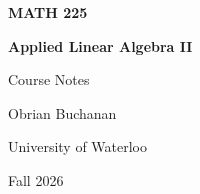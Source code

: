 \documentclass[11pt,letterpaper]{article}
\begin{document}
\hypersetup{pageanchor=false}
\begin{titlepage}
    \vspace*{\fill}
    \begin{center}
        {\Huge\bfseries\color{ink} MATH 225\par}
        \vspace{0.4cm}
        {\LARGE\bfseries\color{ink} Applied Linear Algebra II\par}
        \vspace{1.2cm}
        {\Large Course Notes\par}
        \vspace{0.6cm}
        {\large Obrian Buchanan\par}
        \vspace{0.3cm}
        {\large University of Waterloo\par}
        \vspace{0.3cm}
        {\large Fall 2026\par}
    \end{center}
    \vspace*{\fill}
\end{titlepage}
\hypersetup{pageanchor=true}

{\setlength{\parskip}{0.3em}\tableofcontents}
\newpage


\newpage

\newpage

\newpage

\end{document}
